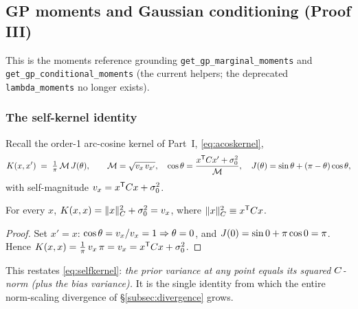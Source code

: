 \subsection{GP moments and Gaussian conditioning (Proof III)}
\label{subsec:moments}

This is the moments reference grounding \texttt{get\_\allowbreak gp\_\allowbreak marginal\_\allowbreak moments} and
\texttt{get\_\allowbreak gp\_\allowbreak conditional\_\allowbreak moments} (the current helpers; the deprecated
\texttt{lambda\_\allowbreak moments} no longer exists).

\subsubsection{The self-kernel identity}
Recall the order-1 arc-cosine kernel of Part~I, \eqref{eq:acoskernel},
\[
  K(x,x') \;=\; \tfrac1\pi\,\mathcal{M}\,J(\theta),\qquad
  \mathcal{M}=\sqrt{v_{x}\,v_{x'}},\quad
  \cos\theta=\frac{x^{\mathsf{T}}C x'+\sigma_{0}^2}{\mathcal{M}},\quad
  J(\theta)=\sin\theta+(\pi-\theta)\cos\theta,
\]
with self-magnitude $v_{x}=x^{\mathsf{T}}C x+\sigma_{0}^2$.

\begin{lemma}\label{lem:selfkernel}
For every $x$, $K(x,x)=\lVert x\rVert_{C}^2+\sigma_{0}^2=v_{x}$, where
$\lVert x\rVert_{C}^2\equiv x^{\mathsf{T}}C x$.
\end{lemma}
\begin{proof}
Set $x'=x$: $\cos\theta=v_x/v_x=1\Rightarrow\theta=0$, and
$J(0)=\sin0+\pi\cos0=\pi$. Hence
$K(x,x)=\tfrac1\pi\,v_x\,\pi=v_x=x^{\mathsf{T}}C x+\sigma_{0}^2$.
\end{proof}

This restates \eqref{eq:selfkernel}: \emph{the prior variance at any point equals
its squared $C$-norm (plus the bias variance).} It is the single identity
from which the entire norm-scaling divergence of \S\ref{subsec:divergence} grows.

